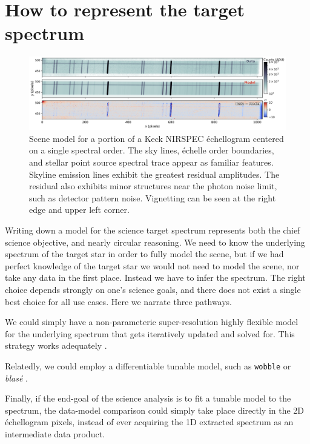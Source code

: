 \documentclass[twocolumn]{aastex631}
\begin{document}
\section{How to represent the target spectrum}

\begin{figure}[t!]
  \centering
  \includegraphics[width=0.98\linewidth]{figures/scene_model_single_order.png}
  \caption{Scene model for a portion of a Keck NIRSPEC \'echellogram centered on a single spectral order.  The sky lines, \'echelle order boundaries, and stellar point source spectral trace appear as familiar features.  Skyline emission lines exhibit the greatest residual amplitudes.  The residual also exhibits minor structures near the photon noise limit, such as detector pattern noise.  Vignetting can be seen at the right edge and upper left corner.}
  \label{fig:sceneModelSingleOrder}
\end{figure}

Writing down a model for the science target spectrum represents both the chief science objective, and nearly circular reasoning. We need to know the underlying spectrum of the target star in order to fully model the scene, but if we had perfect knowledge of the target star we would not need to model the scene, nor take any data in the first place.  Instead we have to infer the spectrum.  The right choice depends strongly on one's science goals, and there does not exist a single best choice for all use cases.  Here we narrate three pathways.

We could simply have a non-parameteric super-resolution highly flexible model for the underlying spectrum that gets iteratively updated and solved for.  This strategy works adequately \citep{2010PASP..122..248B}.

Relatedly, we could employ a differentiable tunable model, such as \texttt{wobble} \citep{2019AJ....158..164B} or \emph{blas\'e} \citep{2022ApJ...941..200G}.

Finally, if the end-goal of the science analysis is to fit a tunable model to the spectrum, the data-model comparison could simply take place directly in the 2D \'echellogram pixels, instead of ever acquiring the 1D extracted spectrum as an intermediate data product.
\end{document}
